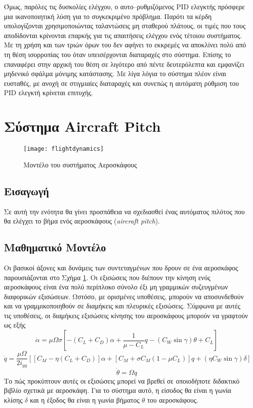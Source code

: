 Όμως, παρόλες τις δυσκολίες ελέγχου, ο αυτο--ρυθμιζόμενος PID ελεγκτής πρόσφερε μια ικανοποιητική λύση για το συγκεκριμένο πρόβλημα. Παρότι τα κέρδη υπολογίζονται χρησιμοποιώντας ταλαντώσεις μη σταθερού πλάτους, οι τιμές που τους αποδίδονται κρίνονται επαρκής για τις απαιτήσεις ελέγχου ενός τέτοιου συστήματος. Με τη χρήση και των τριών όρων του δεν αφήνει το εκκρεμές να αποκλίνει πολύ από τη θέση ισορροπίας του όταν υπεισέρχονται διαταραχές στο σύστημα. Επίσης το επαναφέρει στην αρχική του θέση σε λιγότερο από πέντε δευτερόλεπτα και εμφανίζει μηδενικό σφάλμα μόνιμης κατάστασης. Με λίγα λόγια το σύστημα πλέον είναι ευσταθές, με ανοχή σε στιγμιαίες διαταραχές και συνεπώς η αυτόματη ρύθμιση του PID ελεγκτή κρίνεται επιτυχής.

\section{Σύστημα Aircraft Pitch}

\begin{figure}[h]
  \centering
  \texttt{[image: flightdynamics]}
  \caption{Μοντέλο του συστήματος Αεροσκάφους}
  \label{fig:flightdynamics}
\end{figure}

\subsection{Εισαγωγή}

Σε αυτή την ενότητα θα γίνει προσπάθεια να σχεδιασθεί ένας αυτόματος πιλότος που θα ελέγχει το βήμα ενός αεροσκάφους (\emph{aircraft pitch}).

\subsection{Μαθηματικό Μοντέλο}
Οι βασικοί άξονες και δυνάμεις των συντεταγμένων που δρουν σε ένα αεροσκάφος παρουσιάζονται στο Σχήμα \ref{fig:flightdynamics}. Οι εξισώσεις που διέπουν την κίνηση ενός αεροσκάφους είναι ένα πολύ περίπλοκο σύνολο έξι μη γραμμικών συζευγμένων διαφορικών εξισώσεων. Ωστόσο, με ορισμένες υποθέσεις, μπορούν να αποσυνδεθούν και να γραμμικοποιηθούν σε διαμήκεις και πλευρικές εξισώσεις. Σύμφωνα με αυτές τις υποθέσεις, οι διαμήκεις εξισώσεις κίνησης του αεροσκάφους μπορούν να γραφτούν ως εξής
\begin{equation}
\dot{\alpha}=\mu\Omega\sigma\left[-\left(C_L+C_D\right)\alpha+\frac{1}{\mu-C_L}q-\left(C_W\sin\gamma\right)\theta+C_L\right]
\end{equation}
\begin{equation}
\dot{q}=\frac{\mu\Omega}{2i_{yy}}\left[\left[C_M-\eta\left(C_L+C_D\right)\right]\alpha+\left[C_M+\sigma C_M\left(1-\mu C_L\right)\right]q+\left(\eta C_W\sin\gamma\right)\delta\right]
\end{equation}
\begin{equation}
\dot{\theta}=\Omega q
\end{equation}
Το πώς προκύπτουν αυτές οι εξισώσεις μπορεί να βρεθεί σε οποιοδήποτε διδακτικό βιβλίο σχετικά με αεροσκάφη. Για το σύστημα αυτό, η είσοδος θα είναι η γωνία κλίσης $\delta$ και η έξοδος θα είναι η γωνία βήματος $\theta$ του αεροσκάφους.

